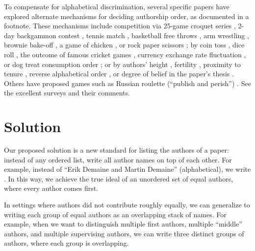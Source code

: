 \documentclass[natbib,authoryear]{sigtbd17-style}
\begin{document}
To compensate for alphabetical discrimination,
several specific papers have explored alternate mechanisms
for deciding authorship order,
as documented in a footnote.
These mechanisms include competition via
25-game croquet series \cite{croquet},
2-day backgammon contest \cite{backgammon},
tennis match \cite{tennis},
basketball free throws \cite{free-throws},
arm wrestling \cite{arm-wrestling},
brownie bake-off \cite{brownie-bakeoff},
a game of chicken \cite{chicken}, or
rock paper scissors \cite{rock-paper-scissors};
by coin toss \cite{coin-toss},
dice roll \cite{dice},
the outcome of famous cricket games \cite{cricket},
currency exchange rate fluctuation \cite{currency-fluctuation}, or
dog treat consumption order \cite{dog};
or by authors' height \cite{height},
fertility \cite{fertility},
proximity to tenure \cite{tenure-proximity},
reverse alphabetical order \cite{reverse-alphabetical},
or degree of belief in the paper's thesis \cite{belief}.
Others have proposed games such as Russian roulette
(``publish and perish'') \cite{publish-and-perish}.
See the excellent surveys \cite{survey1,survey2,survey3}
and their comments.


\section{Solution}

Our proposed solution is a new standard for listing the authors of a paper:
instead of any ordered list, write all author names on top of each other.
For example, instead of ``Erik Demaine and Martin Demaine'' (alphabetical),
we write .
In this way, we achieve the true ideal of an unordered set of equal authors,
where every author comes first.

In settings where authors did not contribute roughly equally, we can generalize
to writing each group of equal authors as an overlapping stack of names.
For example, when we want to distinguish multiple first authors,
multiple ``middle'' authors, and multiple supervising authors,
we can write three distinct groups of authors,
where each group is overlapping.
\end{document}
